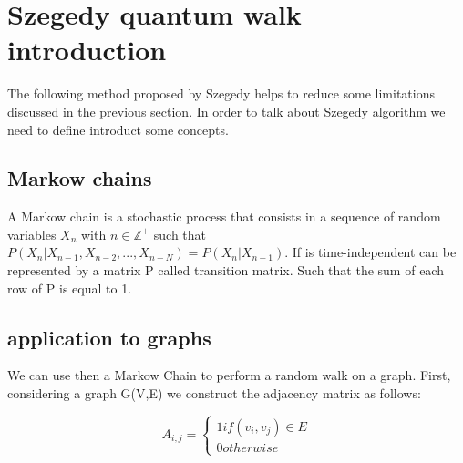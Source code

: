\section{Szegedy quantum walk introduction}

The following method proposed by Szegedy helps to reduce some limitations discussed in the previous section. In order to 
talk about Szegedy algorithm we need to define introduct some concepts.

\subsection{Markow chains}

A Markow chain is a stochastic process that consists in a sequence of random variables $X_{n}$ with $n \in \mathbb{Z}^{+}$
such that $P(X_{n} | X_{n-1}, X_{n-2},...,X_{n-N}) = P(X_{n} | X_{n-1})$. If is time-independent can be represented
by a matrix P called transition matrix. Such that the sum of each row of P is equal to 1.

\subsection{application to graphs}

We can use then a Markow Chain to perform a random walk on a graph. First, considering a graph G(V,E) we construct the adjacency matrix
as follows:

\begin{equation}
    A_{i,j} = 
    \begin{cases} 
        1 if (v_{i}, v_{j}) \in E \\
        0 otherwise
    \end{cases}
\end{equation}
